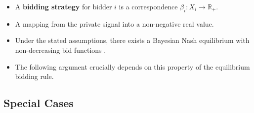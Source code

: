 \documentclass[
]{book}
\providecommand{\tightlist}{%
  \setlength{\itemsep}{0pt}\setlength{\parskip}{0pt}}
\begin{document}
\begin{itemize}
\tightlist
\item
  A \textbf{bidding strategy} for bidder \(i\) is a correspondence \(\beta_i: X_i \to \mathbb{R}_+\).
\item
  A mapping from the private signal into a non-negative real value.
\item
  Under the stated assumptions, there exists a Bayesian Nash equilibrium with non-decreasing bid functions \citep{krishnaAuctionTheory2009}.
\item
  The following argument crucially depends on this property of the equilibrium bidding rule.
\end{itemize}

\hypertarget{special-cases}{%
\subsection{Special Cases}\label{special-cases}}
\end{document}

